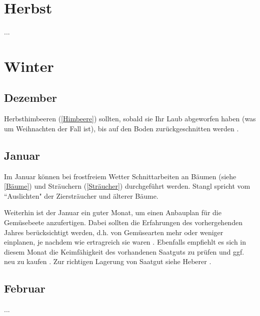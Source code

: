 \section{Herbst}

...

\pagebreak

\section{Winter}

\subsection{Dezember}

Herbsthimbeeren (\ref{Himbeere}) sollten, sobald sie Ihr Laub abgeworfen haben (was um Weihnachten der Fall ist), bis auf den Boden zurückgeschnitten werden \cite[S.~421]{Don2021}.

\subsection{Januar}

Im Januar können bei frostfreiem Wetter Schnittarbeiten an \textrightarrow Bäumen (siehe \ref{Bäume}) und \textrightarrow Sträuchern (\ref{Sträucher}) durchgeführt werden.
Stangl \cite[S.~256]{Stangl1995} spricht vom ``Auslichten" der Ziersträucher und älterer Bäume.

Weiterhin ist der Januar ein guter Monat, um einen Anbauplan für die Gemüsebeete anzufertigen.
Dabei sollten die Erfahrungen des vorhergehenden Jahres berücksichtigt werden, d.h. von Gemüsearten mehr oder weniger einplanen, je nachdem wie ertragreich sie waren \cite[S.~256]{Stangl1995}.
Ebenfalls empfiehlt es sich in diesem Monat die Keimfähigkeit des vorhandenen Saatguts zu prüfen und ggf. neu zu kaufen \cite[S.~216]{Heberer2018}.
Zur richtigen Lagerung von Saatgut siehe Heberer \cite[S.~179]{Heberer2018}.

\subsection{Februar}

...

